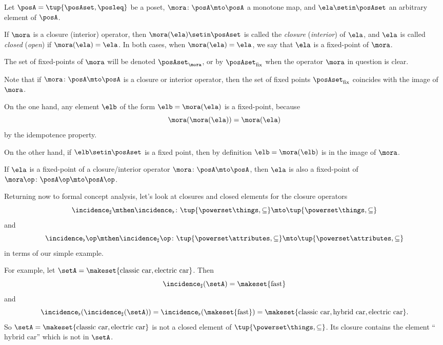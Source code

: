 \begin{definition}\label{def:closure-closed-elements}
Let $\posA = \tup{\posAset, \posleq}$ be a poset, $\mora \colon \posA \mto \posA$ a monotone map, and $\ela \setin \posAset$ an arbitrary element of $\posA$.

If $\mora$ is a closure (interior) operator, then $\mora(\ela) \setin \posAset$ is called the \emph{closure} (\emph{interior}) of $\ela$, and $\ela$ is called \emph{closed} (\emph{open}) if $\mora(\ela) = \ela$. In both cases, when $\mora(\ela) = \ela$, we say that $\ela$ is a fixed-point of $\mora$. 

The set of fixed-points of $\mora$ will be denoted $\posAset_\mora$, or by $\posAset_{\text{fix}}$ when the operator $\mora$ in question is clear. 
\end{definition}

\begin{remark}\label{rem:closed-elements-are-image}
Note that if $\mora \colon \posA \mto \posA$ is a closure or interior operator, then the set of fixed points $\posAset_{\text{fix}}$ coincides with the image of $\mora$.  

On the one hand, any element $\elb$ of the form $\elb = \mora(\ela)$ is a fixed-point, because
\begin{equation}
\mora(\mora(\ela)) = \mora(\ela)
\end{equation}
by the idempotence property. 

On the other hand, if $\elb \setin \posAset$ is a fixed point, then by definition $\elb = \mora(\elb)$ is in the image of $\mora$.
\end{remark}

\begin{remark}\label{rem:fixed-points-coincide-closure-or-interior}
If $\ela$ is a fixed-point of a closure/interior operator $\mora \colon \posA \mto \posA$, then $\ela$ is also a fixed-point of $\mora\op \colon \posA\op \mto \posA\op$. 
\end{remark}


Returning now to formal concept analysis, let's look at closures and closed elements for the closure operators 
$$\incidence_\sharp \mthen \incidence_\flat \colon \tup{\powerset \things, \subseteq} \mto \tup{\powerset \things, \subseteq}$$  
and 
$$\incidence_\flat\op \mthen \incidence_\sharp\op \colon \tup{\powerset \attributes, \subseteq} \mto \tup{\powerset \attributes, \subseteq} $$ 
in terms of our simple example. 

For example, let $\setA = \makeset{\text{classic car}, \text{electric car}}$. Then 
\begin{equation}
\incidence_\sharp(\setA) = \makeset{\text{fast}}
\end{equation}
and 
\begin{equation}
\incidence_\flat(\incidence_\sharp(\setA)) = \incidence_\flat(\makeset{\text{fast}}) = \makeset{\text{classic car}, \text{hybrid car}, \text{electric car}}.
\end{equation}
So $\setA = \makeset{\text{classic car}, \text{electric car}}$ is not a closed element of $\tup{\powerset \things, \subseteq}$. Its closure contains the element ``$\text{hybrid car}$'' which is not in $\setA$.

